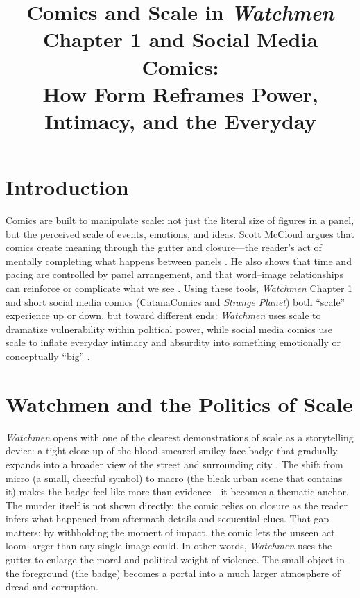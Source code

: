 \documentclass[conference]{IEEEtran}
\begin{document}
\title{Comics and Scale in \textit{Watchmen} Chapter 1 and Social Media Comics:\\
How Form Reframes Power, Intimacy, and the Everyday}

\author{
}

\maketitle

\section{Introduction}
Comics are built to manipulate scale: not just the literal size of figures in a panel, but the perceived scale of events, emotions, and ideas. Scott McCloud argues that comics create meaning through the gutter and closure---the reader’s act of mentally completing what happens between panels \cite{McCloud1993}. He also shows that time and pacing are controlled by panel arrangement, and that word--image relationships can reinforce or complicate what we see \cite{McCloud1993}. Using these tools, \textit{Watchmen} Chapter 1 and short social media comics (CatanaComics and \textit{Strange Planet}) both ``scale'' experience up or down, but toward different ends: \textit{Watchmen} uses scale to dramatize vulnerability within political power, while social media comics use scale to inflate everyday intimacy and absurdity into something emotionally or conceptually ``big'' \cite{MooreGibbonsWatchmen,CourseWeek12,CatanaComics,Pyle2019}.

\section{Watchmen and the Politics of Scale}
\textit{Watchmen} opens with one of the clearest demonstrations of scale as a storytelling device: a tight close-up of the blood-smeared smiley-face badge that gradually expands into a broader view of the street and surrounding city \cite{MooreGibbonsWatchmen}. The shift from micro (a small, cheerful symbol) to macro (the bleak urban scene that contains it) makes the badge feel like more than evidence---it becomes a thematic anchor. The murder itself is not shown directly; the comic relies on closure as the reader infers what happened from aftermath details and sequential clues. That gap matters: by withholding the moment of impact, the comic lets the unseen act loom larger than any single image could. In other words, \textit{Watchmen} uses the gutter to enlarge the moral and political weight of violence. The small object in the foreground (the badge) becomes a portal into a much larger atmosphere of dread and corruption.
\end{document}
